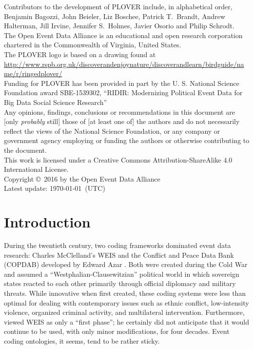 \documentclass[11pt]{report}
\begin{document}
\noindent Contributors to the development of PLOVER include, in alphabetical order, Benjamin Bagozzi, John Beieler, Liz Boschee, Patrick T.~Brandt, Andrew Halterman, Jill Irvine, Jennifer S.~Holmes, Javier Osorio and Philip Schrodt.\\

\noindent The Open Event Data Alliance is an educational and open research corporation chartered in the Commonwealth of Virginia, United States.\\

\noindent The PLOVER logo is based on a drawing found at\\ \url{http://www.rspb.org.uk/discoverandenjoynature/discoverandlearn/birdguide/name/r/ringedplover/}\\

\noindent Funding for PLOVER has been provided in part by the U. S. National Science Foundation award SBE-1539302, ``RIDIR: Modernizing Political Event Data for Big Data Social Science Research''\\

\noindent Any opinions, findings, conclusions or recommendations in this document are [only \textit{probably} still] those of [at least one of] the authors and do not necessarily reflect the views of the National Science Foundation, or any company or government agency employing or funding the authors or otherwise contributing to the document.\\

\noindent This work is licensed under a Creative Commons Attribution-ShareAlike 4.0 International License.\\

\noindent  Copyright \copyright ~2016 by the Open Event Data Alliance \\

\noindent Latest update: \today~(UTC)


\chapter{Introduction}

During the twentieth century, two coding frameworks dominated event data research: Charles McClelland's WEIS \citep{McClelland67,McClelland76}  and the Conflict and Peace Data Bank (COPDAB) developed by Edward Azar \citep{AzarSloan75, Azar80, Azar82}. Both were created during the Cold War and assumed a ``Westphalian-Clausewitzian'' political world in which sovereign states reacted to each other primarily through official diplomacy
and military threats. While innovative when first created, these coding systems were less than optimal for dealing with contemporary issues such as ethnic conflict, low-intensity violence, organized criminal activity, and multilateral intervention. Furthermore, \citet[pg. 177]{McClelland83} viewed WEIS as only a ``first phase''; he certainly did not anticipate that it would continue to be used, with only minor modifications, for four decades. Event coding ontologies, it seems, tend to be rather sticky.
\end{document}
